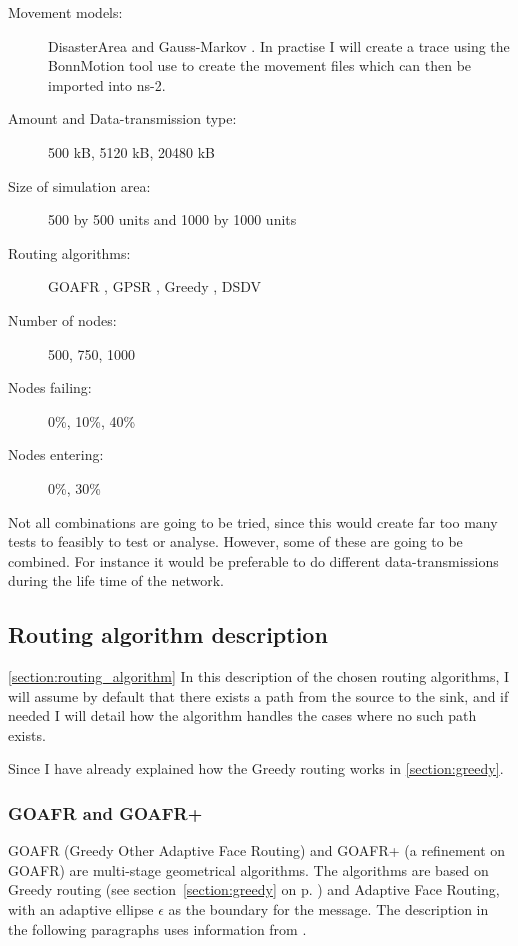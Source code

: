 \begin{description}
\item[Movement models:] DisasterArea \cite{disasterArea} and Gauss-Markov \cite{MobilityAdHocResearch}. In practise I will create a trace using the BonnMotion tool \cite{toilers} use to create the movement files which can then be imported into ns-2.
\item[Amount and Data-transmission type:] 500 kB, 5120 kB, 20480 kB
\item[Size of simulation area:] 500 by 500 units and 1000 by 1000 units
\item[Routing algorithms:] GOAFR \cite{gopher}, GPSR \cite{gpsr}, Greedy \cite{gopher}, DSDV \cite{DSDV}
\item[Number of nodes:] 500, 750, 1000
\item[Nodes failing:] 0\%, 10\%, 40\%
\item[Nodes entering:] 0\%, 30\%
\end{description}

Not all combinations are going to be tried, since this would create far too many tests to feasibly to test or analyse. However, some of these are going to be combined. For instance it would be preferable to do different data-transmissions during the life time of the network.

\subsection{Routing algorithm description}
\ref{section:routing_algorithm}
In this description of the chosen routing algorithms, I will assume by default that there exists a path from the source to the sink, and if needed I will detail how the algorithm handles the cases where no such path exists.

Since I have already explained how the Greedy routing works in \ref{section:greedy}.

\subsubsection{GOAFR and GOAFR+}

GOAFR \cite{gopher} (Greedy Other Adaptive Face Routing) and GOAFR+ \cite{gopher+} (a refinement on GOAFR) are multi-stage geometrical algorithms. The algorithms are based on Greedy routing (see section~\ref{section:greedy} on p. \pageref{section:greedy}) and Adaptive Face Routing, with an adaptive ellipse $\epsilon$ as the boundary for the message. The description in the following paragraphs uses information from \cite{gopher}.

